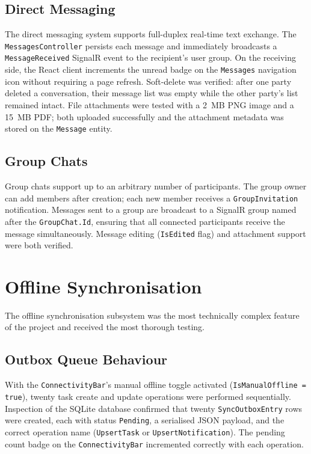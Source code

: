 \subsection*{Direct Messaging}

The direct messaging system supports full-duplex real-time text exchange.
The \texttt{MessagesController} persists each message and immediately broadcasts a
\texttt{MessageReceived} SignalR event to the recipient's user group.
On the receiving side, the React client increments the unread badge on the
\texttt{Messages} navigation icon without requiring a page refresh.
Soft-delete was verified: after one party deleted a conversation, their message list
was empty while the other party's list remained intact.
File attachments were tested with a 2~MB PNG image and a 15~MB PDF; both uploaded
successfully and the attachment metadata was stored on the \texttt{Message} entity.

\subsection*{Group Chats}

Group chats support up to an arbitrary number of participants.
The group owner can add members after creation; each new member receives a
\texttt{GroupInvitation} notification.
Messages sent to a group are broadcast to a SignalR group named after the
\texttt{GroupChat.Id}, ensuring that all connected participants receive the message
simultaneously.
Message editing (\texttt{IsEdited} flag) and attachment support were both verified.

\section{Offline Synchronisation}\label{sec:res_sync}

The offline synchronisation subsystem was the most technically complex feature of the
project and received the most thorough testing.

\subsection*{Outbox Queue Behaviour}

With the \texttt{ConnectivityBar}'s manual offline toggle activated
(\texttt{IsManualOffline = true}), twenty task create and update operations were
performed sequentially.
Inspection of the SQLite database confirmed that twenty \texttt{SyncOutboxEntry} rows
were created, each with status \texttt{Pending}, a serialised JSON payload, and the
correct operation name (\texttt{UpsertTask} or \texttt{UpsertNotification}).
The pending count badge on the \texttt{ConnectivityBar} incremented correctly with each
operation.

